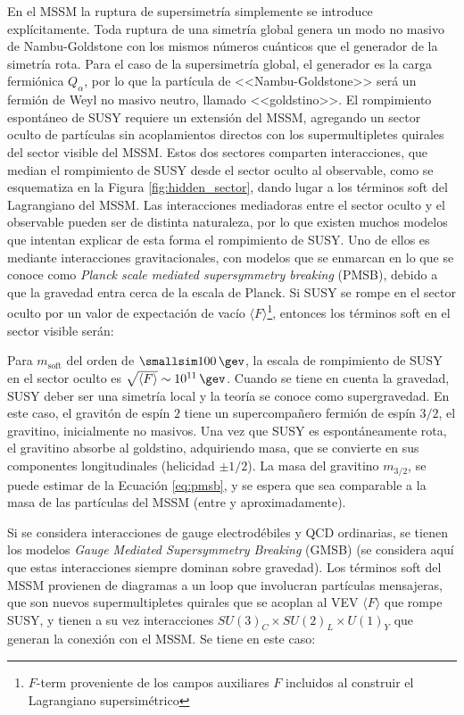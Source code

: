 En el MSSM la ruptura de supersimetría simplemente se introduce explícitamente. Toda ruptura de una simetría global genera un modo no masivo de Nambu-Goldstone con los mismos números cuánticos que el generador de la simetría rota.
Para el caso de la supersimetría global, el generador es la carga fermiónica $Q_{\alpha}$,
por lo que la partícula de <<Nambu-Goldstone>> será un fermión de Weyl no masivo
neutro, llamado <<goldstino>>.
El rompimiento espontáneo de SUSY requiere un extensión del MSSM, agregando un sector oculto de partículas sin acoplamientos directos con los supermultipletes quirales del sector visible del
MSSM. Estos dos sectores comparten interacciones, que median el rompimiento de
SUSY desde el sector oculto al observable, como se esquematiza en la Figura \ref{fig:hidden_sector}, dando lugar a los términos soft del Lagrangiano del MSSM.
Las interacciones mediadoras entre el sector oculto y el observable pueden ser
de distinta naturaleza, por lo que existen muchos modelos que intentan explicar de
esta forma el rompimiento de SUSY. Uno de ellos es mediante interacciones gravitacionales, con modelos que se enmarcan en lo que se conoce como \textit{Planck scale mediated supersymmetry breaking} (PMSB), debido a que la gravedad entra cerca de la escala de Planck. Si SUSY se rompe en el sector oculto por un valor de expectación de vacío $\langle F \rangle$\footnote{$F$-term proveniente de los campos auxiliares $F$ incluidos al construir el Lagrangiano supersimétrico}, entonces los términos soft en el sector visible serán:




Para $m_{\text{soft}}$ del orden de ${\smallsim}100\,\gev$, la escala de rompimiento de SUSY en el sector oculto es $\sqrt{\langle F \rangle}\sim 10^{11}\,\gev$.
Cuando se tiene en cuenta la gravedad, SUSY deber ser una simetría local y la
teoría se conoce como supergravedad. En este caso, el gravitón de espín $2$ tiene un
supercompañero fermión de espín $3/2$, el gravitino, inicialmente no masivos. Una vez
que SUSY es espontáneamente rota, el gravitino absorbe al goldstino, adquiriendo
masa, que se convierte en sus componentes longitudinales (helicidad $\pm1/2$). La masa
del gravitino $m_{3/2}$, se puede estimar de la Ecuación \ref{eq:pmsb}, y se espera que sea comparable a la masa de las partículas del MSSM (entre  y  aproximadamente).

Si se considera interacciones de gauge electrodébiles y QCD ordinarias, se tienen
los modelos \textit{Gauge Mediated Supersymmetry Breaking} (GMSB) \cite{Dine:1981gu, ALVAREZGAUME198296, Nappi:1982hm} (se considera aquí que estas interacciones siempre dominan sobre gravedad). Los términos
soft del MSSM provienen de diagramas a un loop que involucran partículas mensajeras, que son nuevos supermultipletes quirales que se acoplan al VEV $\langle F \rangle$ que
rompe SUSY, y tienen a su vez interacciones $SU(3)_C \times SU(2)_L \times U(1)_Y$ que generan
la conexión con el MSSM. Se tiene en este caso:


